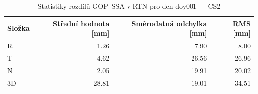 \begin{table}[H]
\centering
\caption{Statistiky rozdílů GOP–SSA v RTN pro den doy001 — CS2}
\label{tab:gop_vs_ssa_cs2_doy001_day_stats}
\begin{tabular}{lrrr}
\toprule
Složka & Střední hodnota [mm] & Směrodatná odchylka [mm] & RMS [mm] \\
\midrule
R & 1.26 & 7.90 & 8.00 \\
T & 4.62 & 26.56 & 26.96 \\
N & 2.05 & 19.91 & 20.02 \\
3D & 28.81 & 19.01 & 34.51 \\
\bottomrule
\end{tabular}
\end{table}
